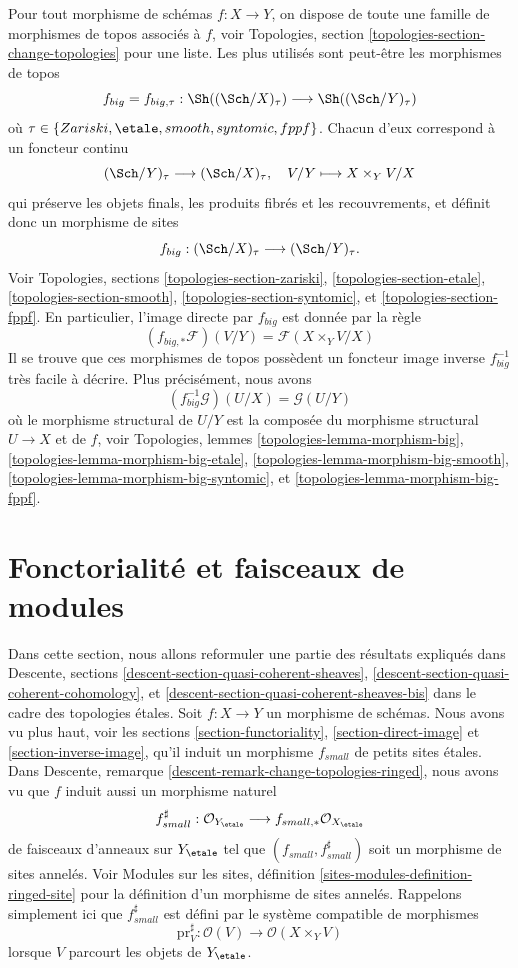 \noindent
Pour tout morphisme de sch\'emas $f : X \to Y$, on dispose de toute une famille de
morphismes de topos associ\'es \`a $f$, voir
Topologies, section \ref{topologies-section-change-topologies}
pour une liste. Les plus utilis\'es sont peut-\^etre les morphismes de topos
$$
f_{big} = f_{big, \tau} :
\Sh((\Sch/X)_\tau)
\longrightarrow
\Sh((\Sch/Y)_\tau)
$$
o\`u $\tau \in \{Zariski, \etale, smooth, syntomic, fppf\}$.
Chacun d'eux correspond \`a un foncteur continu
$$
(\Sch/Y)_\tau \longrightarrow (\Sch/X)_\tau, \quad
V/Y \longmapsto X \times_Y V/X
$$
qui pr\'eserve les objets finals, les produits fibr\'es et les recouvrements, et d\'efinit donc
un morphisme de sites
$$
f_{big} : (\Sch/X)_\tau \longrightarrow (\Sch/Y)_\tau.
$$
Voir
Topologies, sections \ref{topologies-section-zariski},
\ref{topologies-section-etale},
\ref{topologies-section-smooth},
\ref{topologies-section-syntomic}, et
\ref{topologies-section-fppf}.
En particulier, l'image directe par $f_{big}$ est donn\'ee par la r\`egle
$$
(f_{big, *}\mathcal{F})(V/Y) = \mathcal{F}(X \times_Y V/X)
$$
Il se trouve que ces morphismes de topos poss\`edent un foncteur image
inverse $f_{big}^{-1}$ tr\`es facile \`a d\'ecrire.
Plus pr\'ecis\'ement, nous avons
$$
(f_{big}^{-1}\mathcal{G})(U/X) = \mathcal{G}(U/Y)
$$
o\`u le morphisme structural de $U/Y$ est la compos\'ee du
morphisme structural $U \to X$ et de $f$, voir
Topologies, lemmes \ref{topologies-lemma-morphism-big},
\ref{topologies-lemma-morphism-big-etale},
\ref{topologies-lemma-morphism-big-smooth},
\ref{topologies-lemma-morphism-big-syntomic}, et
\ref{topologies-lemma-morphism-big-fppf}.







\section{Fonctorialit\'e et faisceaux de modules}
\label{section-morphisms-modules}

\noindent
Dans cette section, nous allons reformuler une partie des r\'esultats expliqu\'es dans
Descente, sections \ref{descent-section-quasi-coherent-sheaves},
\ref{descent-section-quasi-coherent-cohomology}, et
\ref{descent-section-quasi-coherent-sheaves-bis}
dans le cadre des topologies \'etales. Soit $f : X \to Y$ un morphisme de
sch\'emas. Nous avons vu plus haut, voir les
sections \ref{section-functoriality}, \ref{section-direct-image} et
\ref{section-inverse-image},
qu'il induit un morphisme $f_{small}$ de petits sites \'etales. Dans
Descente, remarque \ref{descent-remark-change-topologies-ringed},
nous avons vu que $f$ induit aussi un morphisme naturel
$$
f_{small}^\sharp :
\mathcal{O}_{Y_\etale}
\longrightarrow
f_{small, *}\mathcal{O}_{X_\etale}
$$
de faisceaux d'anneaux sur
$Y_\etale$ tel que $(f_{small}, f_{small}^\sharp)$
soit un morphisme de sites annel\'es. Voir
Modules sur les sites, définition \ref{sites-modules-definition-ringed-site}
pour la d\'efinition d'un morphisme de sites annel\'es.
Rappelons simplement ici que $f_{small}^\sharp$ est d\'efini par le
syst\`eme compatible de morphismes
$$
\text{pr}_V^\sharp : \mathcal{O}(V) \longrightarrow \mathcal{O}(X \times_Y V)
$$
lorsque $V$ parcourt les objets de $Y_\etale$.

